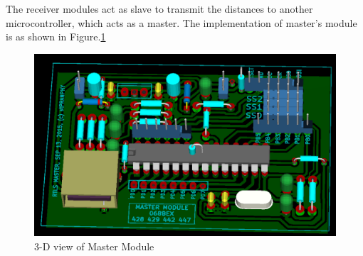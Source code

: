 The receiver modules act as slave to transmit the distances to another microcontroller, which acts as a master. The implementation of master's module is as shown in Figure.\ref{fig:MasterModule}
\begin{figure}[htpb]
	\centering
	\includegraphics[scale=0.25]{Images/MasterModule.png}
	\caption{3-D view of Master Module}
	\label{fig:MasterModule}
\end{figure}
